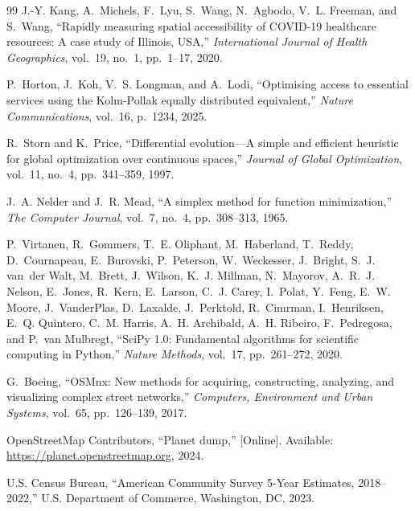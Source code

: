 \documentclass[conference]{IEEEtran}
\begin{document}
\begin{thebibliography}{99}
J.-Y. Kang, A.~Michels, F.~Lyu, S.~Wang, N.~Agbodo, V.~L. Freeman,
and S.~Wang, ``Rapidly measuring spatial accessibility of COVID-19
healthcare resources: A case study of Illinois, USA,''
\textit{International Journal of Health Geographics}, vol.~19, no.~1,
pp.~1--17, 2020.

P.~Horton, J.~Koh, V.~S. Longman, and A.~Lodi, ``Optimising access
to essential services using the Kolm-Pollak equally distributed
equivalent,'' \textit{Nature Communications}, vol.~16, p.~1234, 2025.

R.~Storn and K.~Price, ``Differential evolution---A simple and
efficient heuristic for global optimization over continuous spaces,''
\textit{Journal of Global Optimization}, vol.~11, no.~4,
pp.~341--359, 1997.

J.~A. Nelder and J.~R. Mead, ``A simplex method for function
minimization,'' \textit{The Computer Journal}, vol.~7, no.~4,
pp.~308--313, 1965.

P.~Virtanen, R.~Gommers, T.~E. Oliphant, M.~Haberland, T.~Reddy,
D.~Cournapeau, E.~Burovski, P.~Peterson, W.~Weckesser, J.~Bright,
S.~J. van~der Walt, M.~Brett, J.~Wilson, K.~J. Millman, N.~Mayorov,
A.~R.~J. Nelson, E.~Jones, R.~Kern, E.~Larson, C.~J. Carey, I.~Polat,
Y.~Feng, E.~W. Moore, J.~VanderPlas, D.~Laxalde, J.~Perktold,
R.~Cimrman, I.~Henriksen, E.~Q. Quintero, C.~M. Harris, A.~H.
Archibald, A.~H. Ribeiro, F.~Pedregosa, and P.~van Mulbregt,
``SciPy 1.0: Fundamental algorithms for scientific computing in
Python,'' \textit{Nature Methods}, vol.~17, pp.~261--272, 2020.

G.~Boeing, ``OSMnx: New methods for acquiring, constructing, analyzing,
and visualizing complex street networks,'' \textit{Computers,
Environment and Urban Systems}, vol.~65, pp.~126--139, 2017.

OpenStreetMap Contributors, ``Planet dump,'' [Online]. Available:
\url{https://planet.openstreetmap.org}, 2024.

U.S. Census Bureau, ``American Community Survey 5-Year Estimates,
2018--2022,'' U.S. Department of Commerce, Washington, DC, 2023.

\end{thebibliography}
\end{document}
